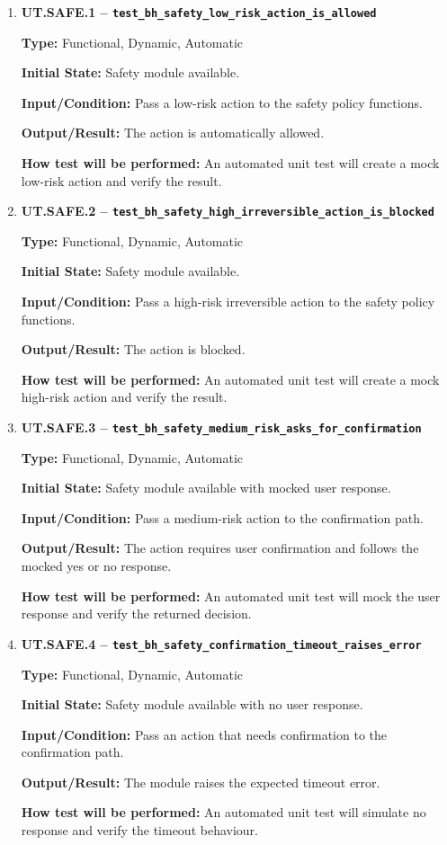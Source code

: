 \documentclass[12pt, titlepage]{article}
\begin{document}
\begin{enumerate}

\item \textbf{UT.SAFE.1 --
\texttt{test\_bh\_safety\_low\_risk\_action\_is\_allowed}}

\textbf{Type:} Functional, Dynamic, Automatic

\textbf{Initial State:} Safety module available.

\textbf{Input/Condition:} Pass a low-risk action to the safety policy
functions.

\textbf{Output/Result:} The action is automatically allowed.

\textbf{How test will be performed:} An automated unit test will create a mock
low-risk action and verify the result.

\item \textbf{UT.SAFE.2 --
\texttt{test\_bh\_safety\_high\_irreversible\_action\_is\_blocked}}

\textbf{Type:} Functional, Dynamic, Automatic

\textbf{Initial State:} Safety module available.

\textbf{Input/Condition:} Pass a high-risk irreversible action to the safety
policy functions.

\textbf{Output/Result:} The action is blocked.

\textbf{How test will be performed:} An automated unit test will create a mock
high-risk action and verify the result.

\item \textbf{UT.SAFE.3 --
\texttt{test\_bh\_safety\_medium\_risk\_asks\_for\_confirmation}}

\textbf{Type:} Functional, Dynamic, Automatic

\textbf{Initial State:} Safety module available with mocked user response.

\textbf{Input/Condition:} Pass a medium-risk action to the confirmation path.

\textbf{Output/Result:} The action requires user confirmation and follows the
mocked yes or no response.

\textbf{How test will be performed:} An automated unit test will mock the user
response and verify the returned decision.

\item \textbf{UT.SAFE.4 --
\texttt{test\_bh\_safety\_confirmation\_timeout\_raises\_error}}

\textbf{Type:} Functional, Dynamic, Automatic

\textbf{Initial State:} Safety module available with no user response.

\textbf{Input/Condition:} Pass an action that needs confirmation to the
confirmation path.

\textbf{Output/Result:} The module raises the expected timeout error.

\textbf{How test will be performed:} An automated unit test will simulate no
response and verify the timeout behaviour.

\end{enumerate}
\end{document}
